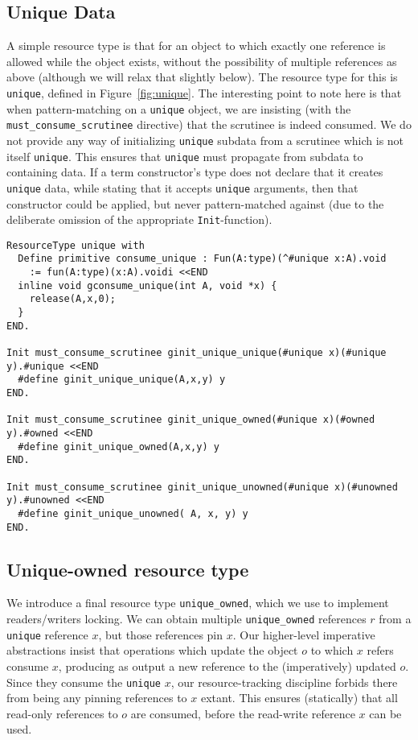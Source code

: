 \documentclass[9pt,natbib]{sigplanconf}
\begin{document}
\subsection{Unique Data}

A simple resource type is that for an object to which exactly one
reference is allowed while the object exists, without the possibility
of multiple references as above (although we will relax that slightly
below).  The resource type for this is \texttt{unique}, defined in
Figure~\ref{fig:unique}.  The interesting point to note here is that
when pattern-matching on a \texttt{unique} object, we are insisting
(with the \texttt{must\_consume\_scrutinee} directive) that the
scrutinee is indeed consumed.  We do not provide any way of
initializing \texttt{unique} subdata from a scrutinee which is not
itself \texttt{unique}.  This ensures that \texttt{unique} must
propagate from subdata to containing data.  If a term constructor's
type does not declare that it creates \texttt{unique} data, while
stating that it accepts \texttt{unique} arguments, then that
constructor could be applied, but never pattern-matched against (due
to the deliberate omission of the appropriate \texttt{Init}-function).

\begin{figure*}
\small
\begin{verbatim}
ResourceType unique with
  Define primitive consume_unique : Fun(A:type)(^#unique x:A).void
    := fun(A:type)(x:A).voidi <<END
  inline void gconsume_unique(int A, void *x) {
    release(A,x,0);
  }
END.

Init must_consume_scrutinee ginit_unique_unique(#unique x)(#unique y).#unique <<END
  #define ginit_unique_unique(A,x,y) y
END.

Init must_consume_scrutinee ginit_unique_owned(#unique x)(#owned y).#owned <<END
  #define ginit_unique_owned(A,x,y) y
END.

Init must_consume_scrutinee ginit_unique_unowned(#unique x)(#unowned y).#unowned <<END
  #define ginit_unique_unowned( A, x, y) y
END.
\end{verbatim}
\caption{The \texttt{unique} resource type}
\label{fig:unique}
\end{figure*}

\subsection{Unique-owned resource type}

We introduce a final resource type \texttt{unique\_owned}, which we
use to implement readers/writers locking.  We can obtain multiple
\texttt{unique\_owned} references $r$ from a \texttt{unique} reference
$x$, but those references pin $x$.  Our higher-level imperative
abstractions insist that operations which update the object $o$ to
which $x$ refers consume $x$, producing as output a new reference to
the (imperatively) updated $o$.  Since they consume the
\texttt{unique} $x$, our resource-tracking discipline forbids there
from being any pinning references to $x$ extant.  This ensures
(statically) that all read-only references to $o$ are consumed, before
the read-write reference $x$ can be used.  
\end{document}
